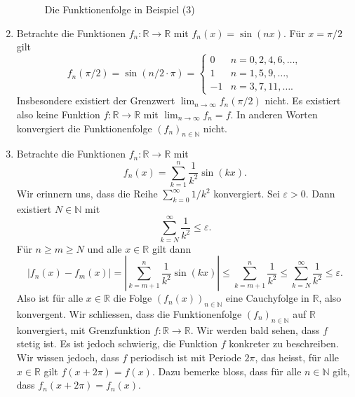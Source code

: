 \documentclass[../main.tex]{subfiles}
\begin{document}
\begin{examples}
\begin{enumerate}[(1)]
      \begin{figure}[htb]
        \centering
        
        \caption{Die Funktionenfolge in Beispiel (3)}%
        \label{fig:discontinuous-limit}
      \end{figure}
    \item Betrachte die Funktionen $f_n \colon \mathbb{R} \to \mathbb{R}$ mit $f_n(x) = \sin(nx)$.
      Für $x = \pi/2$ gilt
      \[
        f_n(\pi/2) = \sin(n/2 \cdot \pi)
        =
        \begin{cases}
          0 & n = 0, 2, 4, 6, \dots,\\
          1 & n = 1, 5, 9, \dots,\\
          -1 & n = 3, 7, 11, \dots.
        \end{cases}
      \]
      Insbesondere existiert der Grenzwert
      \(
      \lim_{n \to \infty} f_n(\pi/2)
      \)
      nicht. Es existiert also keine Funktion
      $f \colon \mathbb{R} \to \mathbb{R}$ 
      mit
      \(
        \lim_{n \to \infty} f_n = f.
      \)
      In anderen Worten konvergiert die
      Funktionenfolge ${(f_{n})}_{n \in \mathbb{N}}$ nicht.
    \item Betrachte die Funktionen
      $f_n \colon \mathbb{R} \to \mathbb{R}$ 
      mit
      \[
        f_n(x) = \sum_{k=1}^{n} \frac{1}{k^2}\sin(kx).
      \]
      Wir erinnern uns, dass die Reihe
      $\sum_{k=0}^{\infty} 1/k^2$ konvergiert.
      Sei $\varepsilon > 0$. Dann existiert
      $N \in \mathbb{N}$ mit
      \[
        \sum_{k=N}^{\infty} \frac{1}{k^2} \leq \varepsilon.
      \]
      Für $n \geq m \geq N$ und alle $x \in \mathbb{R}$ 
      gilt dann
      \[
        |f_n(x) - f_m(x)| =
        \left| \sum_{k=m+1}^{n} \frac{1}{k^2} \sin(kx) \right|
        \leq
        \sum_{k=m+1}^{n} \frac{1}{k^2} \leq
        \sum_{k=N}^{\infty} \frac{1}{k^2} \leq \varepsilon.
      \]
      Also ist für alle
      $x \in \mathbb{R}$ 
      die Folge ${(f_{n}(x))}_{n \in \mathbb{N}}$
      eine Cauchyfolge in $\mathbb{R}$,
      also konvergent.
      Wir schliessen, dass die Funktionenfolge
      ${(f_{n})}_{n \in \mathbb{N}}$ auf $\mathbb{R}$ 
      konvergiert, mit Grenzfunktion
      $f \colon \mathbb{R} \to \mathbb{R}$.
      Wir werden bald sehen, dass $f$ stetig ist.
      Es ist jedoch schwierig, die Funktion
      $f$ konkreter zu beschreiben. Wir wissen jedoch,
      dass $f$ periodisch ist mit Periode $2\pi$,
      das heisst, für alle $x \in \mathbb{R}$ gilt
      $f(x + 2\pi) = f(x)$.
      Dazu bemerke bloss, dass für alle $n \in \mathbb{N}$ 
      gilt, dass $f_n(x + 2 \pi) = f_n(x)$.
  \end{enumerate}
\end{examples}
\end{document}
